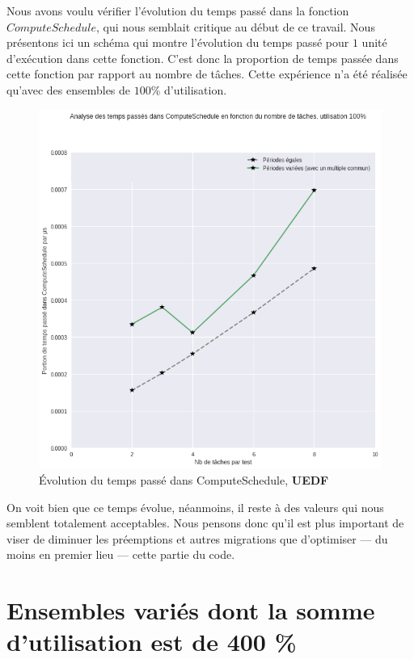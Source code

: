 	Nous avons voulu vérifier l'évolution du temps passé dans la fonction $ComputeSchedule$, qui nous semblait critique 
	au début de ce travail. Nous présentons ici un schéma qui montre 
	l'évolution du temps passé pour $1$ unité d'exécution dans cette fonction. C'est donc la 
	proportion de temps passée dans cette fonction par rapport au nombre de tâches. \newline
	Cette expérience n'a été réalisée qu'avec des ensembles de $100$\% d'utilisation.

	\begin{figure}[H]
	\label{timeevolution}
		\caption{Évolution du temps passé dans ComputeSchedule, \textbf{UEDF}}
		\includegraphics[scale=0.5]{img/wcet/elapsedInCompueSchedule}
	\end{figure}		

	On voit bien que ce temps évolue, néanmoins, il reste à des valeurs qui nous semblent totalement acceptables.
	Nous pensons donc qu'il est plus important de viser de diminuer les préemptions et autres migrations que 
	d'optimiser --- du moins en premier lieu --- cette partie du code.
	
	
\section{Ensembles variés dont la somme d'utilisation est de 400 \%}

